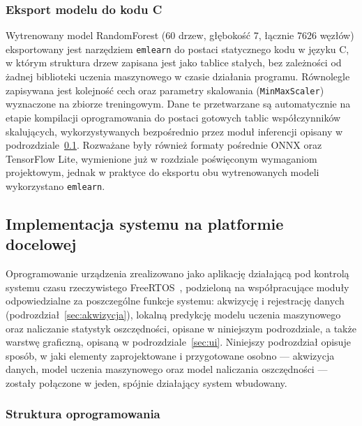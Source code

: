 \subsubsection{Eksport modelu do kodu C}

Wytrenowany model RandomForest (60 drzew, głębokość 7, łącznie 7626 węzłów)
eksportowany jest narzędziem \texttt{emlearn} do postaci statycznego kodu
w języku C, w którym struktura drzew zapisana jest jako tablice stałych, bez
zależności od żadnej biblioteki uczenia maszynowego w czasie działania
programu. Równolegle zapisywana jest kolejność cech oraz parametry skalowania
(\texttt{MinMaxScaler}) wyznaczone na zbiorze treningowym. Dane te
przetwarzane są automatycznie na etapie kompilacji oprogramowania do postaci
gotowych tablic współczynników skalujących, wykorzystywanych bezpośrednio
przez moduł inferencji opisany w podrozdziale~\ref{sec:implementacja}.
Rozważane
były również formaty pośrednie ONNX oraz TensorFlow Lite, wymienione już
w rozdziale poświęconym wymaganiom projektowym, jednak w praktyce do eksportu
obu wytrenowanych modeli wykorzystano \texttt{emlearn}.

\subsection{Implementacja systemu na platformie docelowej}
\label{sec:implementacja}

Oprogramowanie urządzenia zrealizowano jako aplikację działającą pod kontrolą
systemu czasu rzeczywistego FreeRTOS~\cite{freertos}, podzieloną na współpracujące moduły
odpowiedzialne za poszczególne funkcje systemu: akwizycję i rejestrację
danych (podrozdział~\ref{sec:akwizycja}), lokalną predykcję modelu uczenia
maszynowego oraz naliczanie statystyk oszczędności, opisane w niniejszym
podrozdziale, a także warstwę graficzną, opisaną w
podrozdziale~\ref{sec:ui}. Niniejszy podrozdział opisuje sposób, w jaki
elementy zaprojektowane i przygotowane osobno --- akwizycja danych, model
uczenia maszynowego oraz model naliczania oszczędności --- zostały
połączone w jeden, spójnie działający system wbudowany.

\subsubsection{Struktura oprogramowania}

